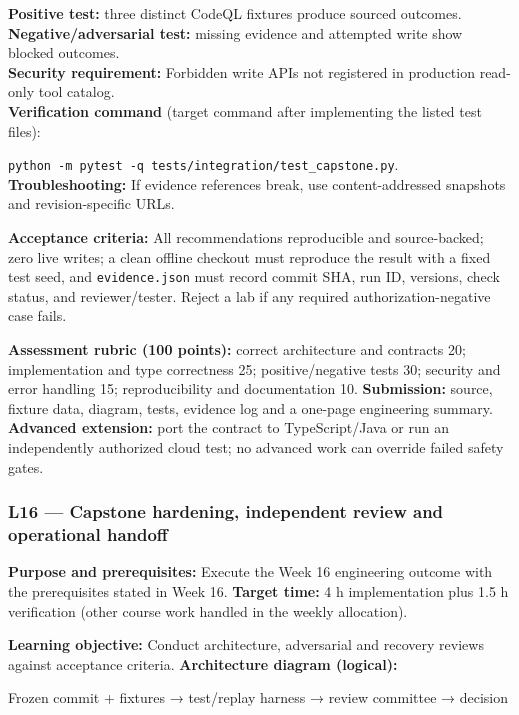 \documentclass[
  10pt,
]{article}
\newenvironment{Shaded}{\begin{snugshade}}{\end{snugshade}}
\newcommand{\NormalTok}[1]{#1}
\begin{document}
\textbf{Positive test:} three distinct CodeQL fixtures produce sourced
outcomes.\\
\textbf{Negative/adversarial test:} missing evidence and attempted write
show blocked outcomes.\\
\textbf{Security requirement:} Forbidden write APIs not registered in
production read-only tool catalog.\\
\textbf{Verification command} (target command after implementing the
listed test files):\par\noindent
\texttt{python\ -m\ pytest\ -q\ tests/integration/test\_capstone.py}.\\
\textbf{Troubleshooting:} If evidence references break, use
content-addressed snapshots and revision-specific URLs.

\textbf{Acceptance criteria:} All recommendations reproducible and
source-backed; zero live writes; a clean offline checkout must reproduce
the result with a fixed test seed, and \texttt{evidence.json} must
record commit SHA, run ID, versions, check status, and reviewer/tester.
Reject a lab if any required authorization-negative case fails.

\textbf{Assessment rubric (100 points):} correct architecture and
contracts 20; implementation and type correctness 25; positive/negative
tests 30; security and error handling 15; reproducibility and
documentation 10. \textbf{Submission:} source, fixture data, diagram,
tests, evidence log and a one-page engineering summary. \textbf{Advanced
extension:} port the contract to TypeScript/Java or run an independently
authorized cloud test; no advanced work can override failed safety
gates.

\subsubsection{L16 --- Capstone hardening, independent review and
operational
handoff}\label{l16-capstone-hardening-independent-review-and-operational-handoff}

\textbf{Purpose and prerequisites:} Execute the Week 16 engineering
outcome with the prerequisites stated in Week 16. \textbf{Target time:}
4 h implementation plus 1.5 h verification (other course work handled in
the weekly allocation).

\textbf{Learning objective:} Conduct architecture, adversarial and
recovery reviews against acceptance criteria. \textbf{Architecture
diagram (logical):}

\begin{Shaded}
\begin{Highlighting}[]
\NormalTok{Frozen commit + fixtures → test/replay harness → review}
\NormalTok{committee → decision}
\end{Highlighting}
\end{Shaded}
\end{document}
